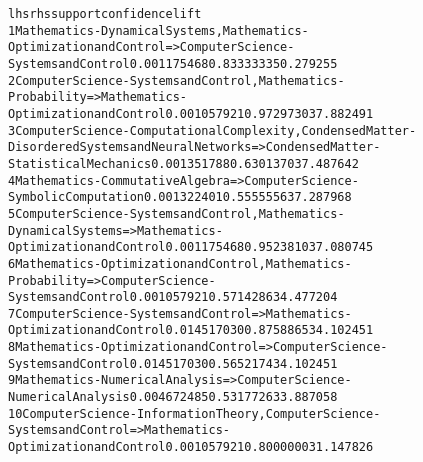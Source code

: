 \begin{alltt}\tiny

lhs                                                            rhs                                                      support confidence      lift
1  {Mathematics - Dynamical Systems, Mathematics - Optimization and Control}                    => {Computer Science - Systems and Control}             0.001175468  0.8333333 50.279255
2  {Computer Science - Systems and Control, Mathematics - Probability}                                 => {Mathematics - Optimization and Control}             0.001057921  0.9729730 37.882491
3  {Computer Science - Computational Complexity, Condensed Matter - Disordered Systems and Neural Networks} => {Condensed Matter - Statistical Mechanics}           0.001351788  0.6301370 37.487642
4  {Mathematics - Commutative Algebra}                         => {Computer Science - Symbolic Computation}            0.001322401  0.5555556 37.287968
5  {Computer Science - Systems and Control, Mathematics - Dynamical Systems}                           => {Mathematics - Optimization and Control}             0.001175468  0.9523810 37.080745
6  {Mathematics - Optimization and Control, Mathematics - Probability}                                 => {Computer Science - Systems and Control}             0.001057921  0.5714286 34.477204
7  {Computer Science - Systems and Control}                    => {Mathematics - Optimization and Control}             0.014517030  0.8758865 34.102451
8  {Mathematics - Optimization and Control}                    => {Computer Science - Systems and Control}             0.014517030  0.5652174 34.102451
9  {Mathematics - Numerical Analysis}                          => {Computer Science - Numerical Analysis}              0.004672485  0.5317726 33.887058
10 {Computer Science - Information Theory, Computer Science - Systems and Control}                    => {Mathematics - Optimization and Control}             0.001057921  0.8000000 31.147826
\end{alltt}
